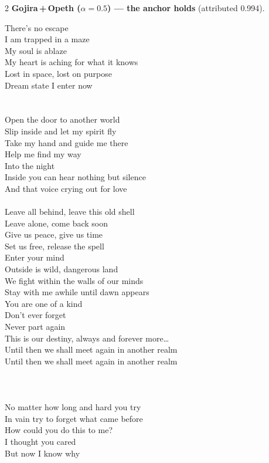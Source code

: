 \begin{multicols}{2}
\nopagebreak\noindent\textbf{Gojira\,+\,Opeth ($\alpha{=}0.5$) --- the anchor holds} (attributed 0.994).\par\nopagebreak\vspace{4pt}
{\footnotesize\itshape\raggedright
There's no escape \\
I am trapped in a maze \\
My soul is ablaze \\
My heart is aching for what it knows \\
Lost in space, lost on purpose \\
Dream state I enter now \\
\mbox{} \\
\mbox{} \\
Open the door to another world \\
Slip inside and let my spirit fly \\
Take my hand and guide me there \\
Help me find my way \\
Into the night \\
Inside you can hear nothing but silence \\
And that voice crying out for love \\
\mbox{} \\
Leave all behind, leave this old shell \\
Leave alone, come back soon \\
Give us peace, give us time \\
Set us free, release the spell \\
Enter your mind \\
Outside is wild, dangerous land \\
We fight within the walls of our minds \\
Stay with me awhile until dawn appears \\
You are one of a kind \\
Don't ever forget \\
Never part again \\
This is our destiny, always and forever more\ldots{} \\
Until then we shall meet again in another realm \\
Until then we shall meet again in another realm \\
\mbox{} \\
\mbox{} \\
\mbox{} \\
No matter how long and hard you try \\
In vain try to forget what came before \\
How could you do this to me? \\
I thought you cared \\
But now I know why\par}
\medskip


\end{multicols}

